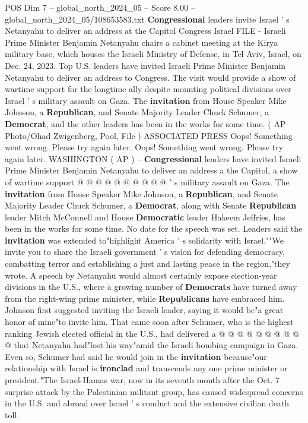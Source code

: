 \begin{textsample}{POS Dim 7 – global\_north\_2024\_05 – Score 8.00 – global\_north\_2024\_05/108653583.txt}  \label{ex:f7_pos_058}
\textbf{Congressional} leaders invite Israel ' s Netanyahu to deliver an address at the Capitol Congress Israel FILE - Israeli Prime Minister Benjamin Netanyahu chairs a cabinet meeting at the Kirya military base, which houses the Israeli Ministry of Defense, in Tel Aviv, Israel, on Dec. 24, 2023.
Top U.S. leaders have invited Israeli Prime Minister Benjamin Netanyahu to deliver an address to Congress.
The visit would provide a show of wartime support for the longtime ally despite mounting political divisions over Israel ' s military assault on Gaza.
The \textbf{invitation} from House Speaker Mike Johnson, a \textbf{Republican}, and Senate Majority Leader Chuck Schumer, a \textbf{Democrat}, and the other leaders has been in the works for some time. ( AP Photo/Ohad Zwigenberg, Pool, File ) ASSOCIATED PRESS Oops!
Something went wrong.
Please try again later.
Oops!
Something went wrong.
Please try again later.
WASHINGTON ( AP ) -- \textbf{Congressional} leaders have invited Israeli Prime Minister Benjamin Netanyahu to deliver an address a the Capitol, a show of wartime support @ @ @ @ @ @ @ @ @ @ ' s military assault on Gaza.
The \textbf{invitation} from House Speaker Mike Johnson, a \textbf{Republican}, and Senate Majority Leader Chuck Schumer, a \textbf{Democrat}, along with Senate \textbf{Republican} leader Mitch McConnell and House \textbf{Democratic} leader Hakeem Jeffries, has been in the works for some time.
No date for the speech was set.
Leaders said the \textbf{invitation} was extended to"highlight America ' s solidarity with Israel.""We invite you to share the Israeli government ' s vision for defending democracy, combatting terror and establishing a just and lasting peace in the region,"they wrote.
A speech by Netanyahu would almost certainly expose election-year divisions in the U.S., where a growing number of \textbf{Democrats} have turned away from the right-wing prime minister, while \textbf{Republicans} have embraced him.
Johnson first suggested inviting the Israeli leader, saying it would be"a great honor of mine"to invite him.
That came soon after Schumer, who is the highest ranking Jewish elected official in the U.S., had delivered a @ @ @ @ @ @ @ @ @ @ that Netanyahu had"lost his way"amid the Israeli bombing campaign in Gaza.
Even so, Schumer had said he would join in the \textbf{invitation} because"our relationship with Israel is \textbf{ironclad} and transcends any one prime minister or president."The Israel-Hamas war, now in its seventh month after the Oct. 7 surprise attack by the Palestinian militant group, has caused widespread concerns in the U.S. and abroad over Israel ' s conduct and the extensive civilian death toll.

\end{textsample}
